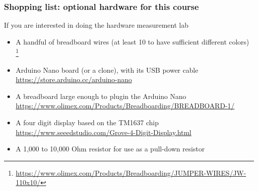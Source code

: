 \begin{frame}
\frametitle{Shopping list: optional hardware for this course}
  If you are interested in doing the hardware measurement lab
    \begin{itemize}
      \item A handful of breadboard wires (at least 10 to have sufficient different colors)
	    \footnote{\tiny \url{https://www.olimex.com/Products/Breadboarding/JUMPER-WIRES/JW-110x10/}}
      \item Arduino Nano board (or a clone), with its USB power cable\\
            \url{https://store.arduino.cc/arduino-nano}
      \item A breadboard large enough to plugin the Arduino Nano\\
            \url{https://www.olimex.com/Products/Breadboarding/BREADBOARD-1/}
      \item A four digit display based on the TM1637 chip\\
            \url{https://www.seeedstudio.com/Grove-4-Digit-Display.html}
      \item A 1,000 to 10,000 Ohm resistor for use as a pull-down resistor
    \end{itemize}
\end{frame}
